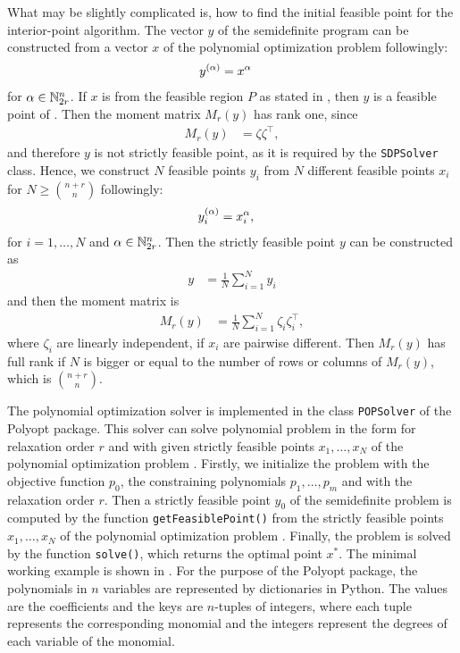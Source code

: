 What may be slightly complicated is, how to find the initial feasible point for the interior-point algorithm.
The vector $y$ of the semidefinite program  can be constructed from a vector $x$ of the polynomial optimization problem  followingly:
\begin{align}
  y^{(\alpha)} &= x^\alpha
\end{align}
for $\alpha \in \mathbb{N}^n_{2r}$.
If $x$ is from the feasible region $P$ as stated in , then $y$ is a feasible point of .
Then the moment matrix $M_r(y)$ has rank one, since
\begin{align}
  M_r(y) &= \zeta\zeta^\top,
\end{align}
and therefore $y$ is not strictly feasible point, as it is required by the \texttt{SDPSolver} class.
Hence, we construct $N$ feasible points $y_i$ from $N$ different feasible points $x_i$ for $N \geq {\binom{n+r}{n}}$ followingly:
\begin{align}
  y_i^{(\alpha)} &= x_i^\alpha,
\end{align}
for $i = 1,\ldots,N$ and $\alpha\in\mathbb{N}_{2r}^n$.
Then the strictly feasible point $y$ can be constructed as
\begin{align}
  y &= \frac{1}{N}\sum_{i=1}^Ny_i
\end{align}
and then the moment matrix is
\begin{align}
   M_r(y) &= \frac{1}{N} \sum_{i=1}^N \zeta_i\zeta_i^\top,
\end{align}
where $\zeta_i$ are linearly independent, if $x_i$ are pairwise different.
Then $M_r(y)$ has full rank if $N$ is bigger or equal to the number of rows or columns of $M_r(y)$, which is ${\binom{n+r}{n}}$.

The polynomial optimization solver is implemented in the class \texttt{POPSolver} of the Polyopt package.
This solver can solve polynomial problem in the form  for relaxation order $r$ and with given strictly feasible points $x_1, \ldots, x_N$ of the polynomial optimization problem .
Firstly, we initialize the problem with the objective function $p_0$, the constraining polynomials $p_1, \ldots, p_m$ and with the relaxation order $r$.
Then a strictly feasible point $y_0$ of the semidefinite problem is computed by the function \texttt{getFeasiblePoint()} from the strictly feasible points $x_1, \ldots, x_N$ of the polynomial optimization problem .
Finally, the problem is solved by the function \texttt{solve()}, which returns the optimal point $x^*$.
The minimal working example is shown in .
For the purpose of the Polyopt package, the polynomials in $n$ variables are represented by dictionaries in Python.
The values are the coefficients and the keys are $n$-tuples of integers, where each tuple represents the corresponding monomial and the integers represent the degrees of each variable of the monomial.

